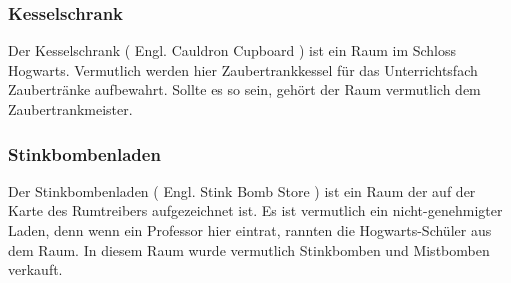\documentclass[a4paper, 10pt]{article}
\begin{document}
\subsubsection*{\large Kesselschrank}
Der Kesselschrank (  Engl.  Cauldron Cupboard ) ist ein Raum im Schloss Hogwarts. Vermutlich werden hier Zaubertrankkessel für das Unterrichtsfach Zaubertränke aufbewahrt. Sollte es so sein, gehört der Raum vermutlich dem Zaubertrankmeister.
\subsubsection*{\large Stinkbombenladen}
Der Stinkbombenladen (  Engl.  Stink Bomb Store ) ist ein Raum der auf der Karte des Rumtreibers aufgezeichnet ist. Es ist vermutlich ein nicht-genehmigter Laden, denn wenn ein Professor hier eintrat, rannten die Hogwarts-Schüler aus dem Raum. In diesem Raum wurde vermutlich Stinkbomben und Mistbomben verkauft.
\end{document}
